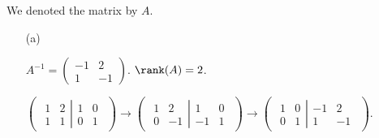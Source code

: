 \begin{Exercise}
	We denoted the matrix by $A$.
	\begin{enumerate}[(a)]
		\item[(a)]
		\begin{answer}
			$A^{-1} = \begin{pmatrix}
			-1 & 2 \\
			1 & -1
			\end{pmatrix}$. $\rank(A) = 2$.
		\end{answer}
		\begin{solution}
			$\begin{pmatrix} \left.\begin{matrix}
			1 & 2 \\
			1 & 1
			\end{matrix} \right| \begin{matrix}
			1 & 0 \\
			0 & 1
			\end{matrix} \end{pmatrix} \longrightarrow \begin{pmatrix} \left.\begin{matrix}
			1 & 2 \\
			0 & -1
			\end{matrix} \right| \begin{matrix}
			1 & 0 \\
			-1 & 1
			\end{matrix} \end{pmatrix} \longrightarrow \begin{pmatrix} \left.\begin{matrix}
			1 & 0 \\
			0 & 1
			\end{matrix} \right| \begin{matrix}
			-1 & 2 \\
			1 & -1
			\end{matrix} \end{pmatrix}$.
		\end{solution}
		

\end{enumerate}
\end{Exercise}
